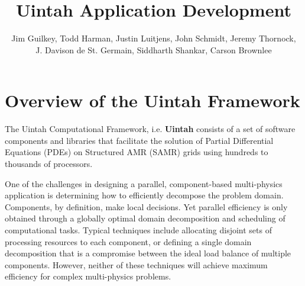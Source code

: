 \documentclass[12pt]{report}
\begin{document}
\title{Uintah Application Development}

\author{Jim Guilkey, Todd Harman, Justin Luitjens, John Schmidt,
  Jeremy Thornock, \\
  J. Davison de St. Germain, Siddharth Shankar, Carson Brownlee}

\maketitle

\tableofcontents

\newpage


\chapter{Overview of the Uintah Framework}

The Uintah Computational Framework, i.e. \textbf{Uintah} consists of a
set of software components and libraries that facilitate the solution
of Partial Differential Equations (PDEs) on Structured AMR (SAMR)
grids using hundreds to thousands of processors.

One of the challenges in designing a parallel, component-based
multi-physics application is determining how to efficiently decompose
the problem domain. Components, by definition, make local
decisions. Yet parallel efficiency is only obtained through a globally
optimal domain decomposition and scheduling of computational
tasks. Typical techniques include allocating disjoint sets of
processing resources to each component, or defining a single domain
decomposition that is a compromise between the ideal load balance of
multiple components. However, neither of these techniques will achieve
maximum efficiency for complex multi-physics problems.
\end{document}
